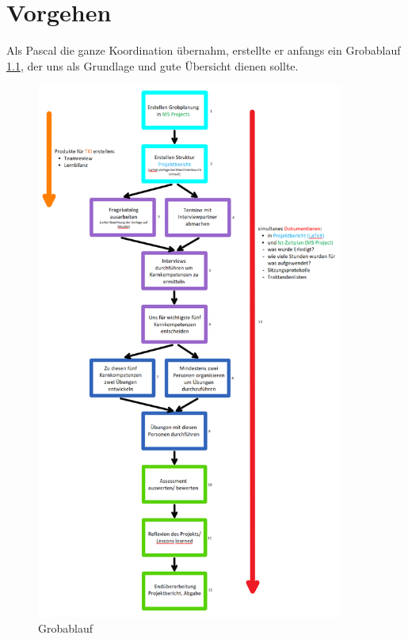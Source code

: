 
\chapter{Vorgehen}

Als Pascal die ganze Koordination übernahm, erstellte er anfangs ein Grobablauf \ref{fig:grobablauf}, der uns als Grundlage und gute Übersicht dienen sollte.

\begin{figure}[ht]
	\centering
	\includegraphics[width=0.9\textwidth]{images/Grobablauf.png}
	\caption{Grobablauf}
	\label{fig:grobablauf}
\end{figure}


